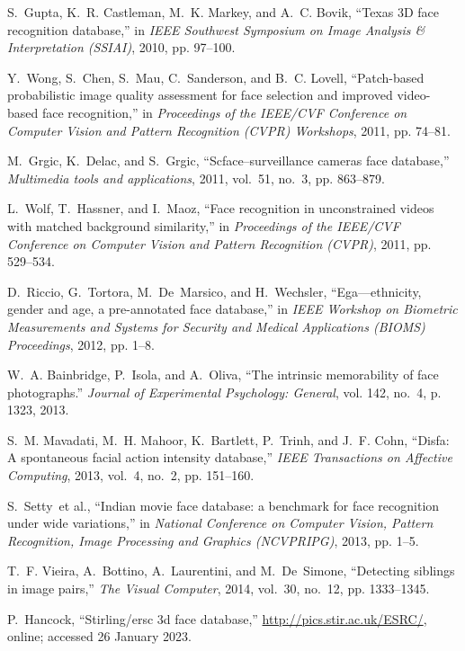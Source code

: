 \documentclass[journal]{IEEEtran}
\begin{document}
\begin{thebibliography}{100}
S.~Gupta, K.~R. Castleman, M.~K. Markey, and A.~C. Bovik, ``Texas 3D face recognition database,'' in \emph{IEEE Southwest Symposium on Image Analysis \& Interpretation (SSIAI)}, 2010, pp. 97--100.

Y.~Wong, S.~Chen, S.~Mau, C.~Sanderson, and B.~C. Lovell, ``Patch-based probabilistic image quality assessment for face selection and improved video-based face recognition,'' in \emph{Proceedings of the IEEE/CVF Conference on Computer Vision and Pattern Recognition (CVPR) Workshops}, 2011, pp. 74--81.

M.~Grgic, K.~Delac, and S.~Grgic, ``Scface--surveillance cameras face database,'' \emph{Multimedia tools and applications}, 2011, vol.~51, no.~3, pp.
863--879.

L.~Wolf, T.~Hassner, and I.~Maoz, ``Face recognition in unconstrained videos with matched background similarity,'' in \emph{Proceedings of the IEEE/CVF Conference on Computer Vision and Pattern Recognition (CVPR)}, 2011, pp. 529--534.

D.~Riccio, G.~Tortora, M.~De~Marsico, and H.~Wechsler, ``Ega—ethnicity, gender and age, a pre-annotated face database,'' in \emph{IEEE Workshop
on Biometric Measurements and Systems for Security and Medical Applications (BIOMS) Proceedings}, 2012, pp.
1--8.

W.~A. Bainbridge, P.~Isola, and A.~Oliva, ``The intrinsic memorability of face photographs.'' \emph{Journal of Experimental Psychology: General}, vol. 142,
no.~4, p. 1323, 2013.

S.~M. Mavadati, M.~H. Mahoor, K.~Bartlett, P.~Trinh, and J.~F. Cohn, ``Disfa: A spontaneous facial action intensity database,'' \emph{IEEE Transactions on Affective Computing}, 2013, vol.~4, no.~2, pp. 151--160.

S.~Setty~et al., ``Indian movie face database: a benchmark for face recognition under wide variations,'' in \emph{National Conference on Computer Vision, Pattern Recognition, Image Processing and Graphics (NCVPRIPG)}, 2013, pp. 1--5.

T.~F. Vieira, A.~Bottino, A.~Laurentini, and M.~De~Simone, ``Detecting siblings in image pairs,'' \emph{The Visual Computer}, 2014, vol.~30, no.~12, pp. 1333--1345.

P.~Hancock, ``Stirling/ersc 3d face database,''
\url{http://pics.stir.ac.uk/ESRC/}, online; accessed 26 January 2023.


\end{thebibliography}
\end{document}
